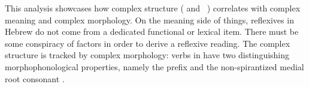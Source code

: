 {{    
}
\xe

%



\vspace{2em}

This analysis showcases how complex structure ({\vz} and {\va}~\!) correlates with complex meaning and complex morphology. On the meaning side of things, reflexives in Hebrew do not come from a dedicated functional or lexical item. There must be some conspiracy of factors in order to derive a reflexive reading. The complex structure is tracked by complex morphology: verbs in {\thit} have two distinguishing morphophonological properties, namely the prefix and the non-spirantized medial root consonant .


}
